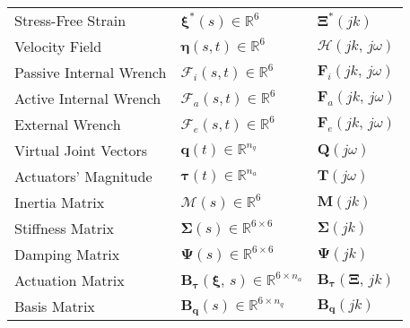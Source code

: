 \begin{table}[h!]
\begin{tabular}{lll}
    Stress-Free Strain & $\bm{\xi}^{*}(s) \in \mathbb{R}^6$ & $\bm{\Xi}^{*}(jk)$  \\
    Velocity Field & $\bm{\eta}(s, t) \in \mathbb{R}^6$ & $\bm{\mathcal{H}}(jk, \, j \omega)$ \\
    Passive Internal Wrench & $\bm{\mathcal{F}}_i(s, t) \in \mathbb{R}^6$ & $\bm{F}_i(jk, \, j \omega)$ \\
    Active Internal Wrench & $\bm{\mathcal{F}}_a(s, t) \in \mathbb{R}^6$ & $\bm{F}_a(jk, \, j \omega)$ \\
    External Wrench & $\bm{\mathcal{F}}_e(s, t) \in \mathbb{R}^6$ & $\bm{F}_e(jk, \, j \omega)$ \\
    Virtual Joint Vectors & $\bm{q}(t) \in \mathbb{R}^{n_q}$ & $\bm{Q}(j \omega)$ \\
    Actuators' Magnitude & $\bm{\tau}(t) \in \mathbb{R}^{n_a}$ & $\bm{T}(j \omega)$ \\
    Inertia Matrix & $\bm{\mathcal{M}}(s) \in \mathbb{R}^{6}$ & $\bm{M}(jk)$ \\
    Stiffness Matrix & $\bm{\Sigma}(s) \in \mathbb{R}^{6 \times 6}$ & $\bm{\Sigma}(jk)$ \\
    Damping Matrix & $\bm{\Psi}(s) \in \mathbb{R}^{6 \times 6}$ & $\bm{\Psi}(jk)$ \\
    Actuation Matrix & $\bm{B}_{\bm{\tau}}\left(\bm{\xi}, \, s\right) \in \mathbb{R}^{6 \times n_a}$ & $\bm{B}_{\bm{\tau}}\left(\bm{\Xi}, \, jk\right)$ \\
    Basis Matrix & $\bm{B}_{\bm{q}}(s) \in \mathbb{R}^{6 \times {n_q}}$ & $\bm{B}_{\bm{q}}(jk)$ \\
    \bottomrule
    \end{tabular}
\end{table}
